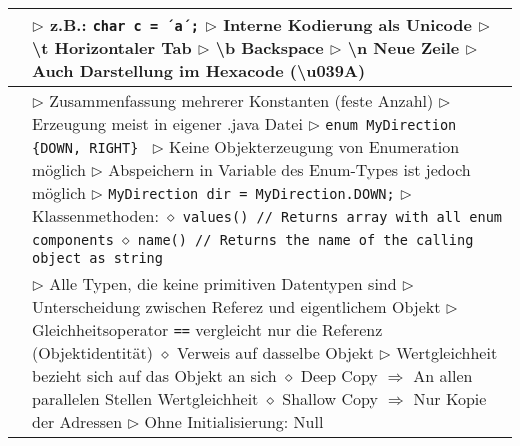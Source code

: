 \begin{tabular}{ | p{} p{} | }
	\makecell[l]{Zeichentyp char} & \makecell[l]{
	$\triangleright$ z.B.: \texttt{char c = ´a´;} \\
	$\triangleright$ Interne Kodierung als Unicode \\
	$\triangleright$ \textbackslash t Horizontaler Tab \\
	$\triangleright$ \textbackslash b Backspace \\
	$\triangleright$ \textbackslash n Neue Zeile \\
	$\triangleright$ Auch Darstellung im Hexacode (\textbackslash u039A)} \\ \hline
	
	\makecell[l]{Enumeration} & \makecell[l]{
	$\triangleright$ Zusammenfassung mehrerer Konstanten (feste Anzahl)\\
	$\triangleright$ Erzeugung meist in eigener .java Datei \\
	$\triangleright$ \texttt{enum MyDirection \{DOWN, RIGHT\} } \\
	$\triangleright$ Keine Objekterzeugung von Enumeration möglich \\
	$\triangleright$ Abspeichern in Variable des Enum-Types ist jedoch möglich \\
	$\triangleright$ \texttt{MyDirection dir = MyDirection.DOWN;} \\
	$\triangleright$ Klassenmethoden: \\
	\hspace{0.4cm} $\diamond$ \texttt{values() // Returns array with all enum components} \\
	\hspace{0.4cm} $\diamond$ \texttt{name() // Returns the name of the calling object as string} \\
	 } \\ \hline
	
	\makecell[l]{Referenztypen} & \makecell[l]{
	$\triangleright$ Alle Typen, die keine primitiven Datentypen sind \\
	$\triangleright$ Unterscheidung zwischen Referez und eigentlichem Objekt \\
	$\triangleright$ Gleichheitsoperator \texttt{==} vergleicht nur die Referenz (Objektidentität) \\
	\hspace{0.4cm} $\diamond$ Verweis auf dasselbe Objekt \\
	$\triangleright$ Wertgleichheit bezieht sich auf das Objekt an sich \\
	\hspace{0.4cm} $\diamond$ Deep Copy $\Rightarrow$ An allen parallelen Stellen Wertgleichheit \\
	\hspace{0.4cm} $\diamond$ Shallow Copy $\Rightarrow$ Nur Kopie der Adressen \\
	$\triangleright$ Ohne Initialisierung: Null} \\ \hline
	\end{tabular}


